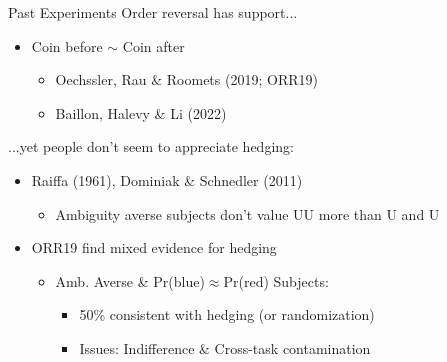 \begin{frame}{Past Experiments}
Order reversal has support...
\begin{itemize}
    \item Coin before $\sim$ Coin after
    \begin{itemize}
        \item Oechssler, Rau \& Roomets (2019; ORR19)
        \item Baillon, Halevy \& Li (2022)
    \end{itemize}
\end{itemize}

\br

...yet people don't seem to appreciate hedging:
\begin{itemize}
    \item Raiffa (1961), Dominiak \& Schnedler (2011)
    \begin{itemize}
        \item Ambiguity averse subjects don't value {\color{red}U}{\color{blue}U} more than {\color{red}U} and {\color{blue}U}
    \end{itemize}
    \item ORR19 find mixed evidence for hedging
    \begin{itemize}
        \item Amb. Averse \& Pr(blue)$\approx$Pr(red) Subjects: 
        \begin{itemize}
            \item 50\% consistent with hedging (or randomization)
            \item Issues: Indifference \& Cross-task contamination
        \end{itemize}
    \end{itemize}
\end{itemize}
\end{frame}


